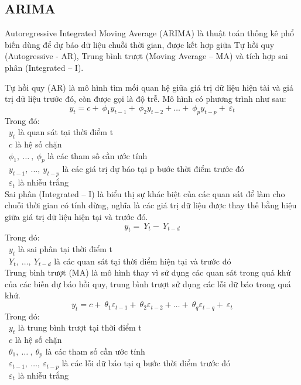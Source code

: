 \subsection{ARIMA}
Autoregressive Integrated Moving Average (ARIMA) là thuật toán thống kê phổ biến dùng để dự báo dữ liệu chuỗi thời gian, được kết hợp giữa Tự hồi quy (Autogressive - AR), Trung bình trượt (Moving Average – MA) và tích hợp sai phân (Integrated – I).
\par
Tự hồi quy (AR) là mô hình tìm mối quan hệ giữa giá trị dữ liệu hiện tài và giá trị dữ liệu trước đó, còn được gọi là độ trễ. Mô hình có phương trình như sau:
\[y_{t} = c + \ \phi_{1}y_{t - 1} + \ \phi_{2}y_{t - 2} + \ldots + \ \phi_{p}y_{t - p} + \ \varepsilon_{t}\]
Trong đó:\\
    \indent\textbullet\ \(y_{t}\) là quan sát tại thời điểm t\\
    \indent\textbullet\ \(c\) là hệ số chặn\\
    \indent\textbullet\ \(\phi_{1},\ \ldots\ ,\ \phi_{p}\) là các tham số cần ước tính\\
    \indent\textbullet\ \(y_{t - 1},\ ...,\ y_{t - p}\) là các giá trị dự báo tại p bước thời điểm trước đó\\
    \indent\textbullet\ \(\varepsilon_{t}\) là nhiễu trắng\\

Sai phân (Integrated – I) là biểu thị sự khác biệt của các quan sát để làm cho chuỗi thời gian có tính dừng, nghĩa là các giá trị dữ liệu được thay thế bằng hiệu giữa giá trị dữ liệu hiện tại và trước đó.
\[y_{t} = \ Y_{t} - \ Y_{t - d}\]
Trong đó:\\
    \indent\textbullet\ \(y_{t}\) là sai phân tại thời điểm t\\
    \indent\textbullet\ \(Y_{t},\ \ldots,\ Y_{t - d}\) là các quan sát tại thời điểm hiện tại và trước đó\\

Trung bình trượt (MA) là mô hình thay vì sử dụng các quan sát trong quá khứ của các biến dự báo hồi quy, trung bình trượt sử dụng các lỗi dữ báo trong quá khứ.
\[y_{t} = c + \ \theta_{1}\varepsilon_{t - 1} + \ \theta_{2}\varepsilon_{t - 2} + \ldots + \ \theta_{q}\varepsilon_{t - q} + \ \varepsilon_{t}\]
Trong đó:\\
    \indent\textbullet\ \(y_{t}\) là trung bình trượt tại thời điểm t\\
    \indent\textbullet\ \(c\) là hệ số chặn\\
    \indent\textbullet\ \(\theta_{1},\ \ldots\ ,\ \theta_{p}\) là các tham số cần ước tính\\
    \indent\textbullet\ \(\varepsilon_{t - 1},\ \ldots,\ \varepsilon_{t - p}\) là các lỗi dữ báo tại q bước thời điểm trước đó\\
    \indent\textbullet\ \(\varepsilon_{t}\) là nhiễu trắng\\

